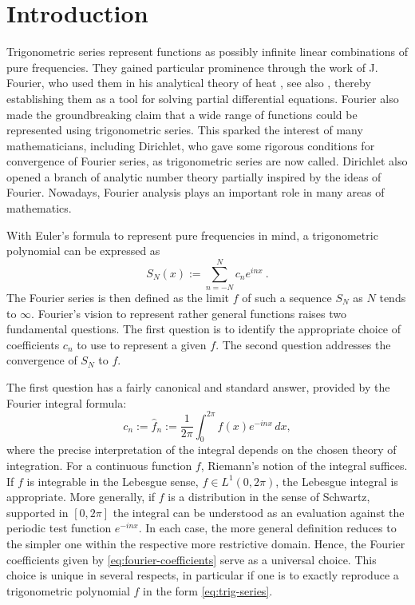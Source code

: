 \section{Introduction}


Trigonometric series represent functions as possibly infinite linear combinations of pure frequencies.
They gained particular prominence through the work of J. Fourier, who used them in his analytical theory of heat \cite{Fourier}, see also \cite{MR3470070}, thereby establishing them as a tool for solving partial differential equations.
Fourier also made the groundbreaking claim that a wide range of functions could be represented using trigonometric series. This sparked the interest of many mathematicians,
including Dirichlet, who gave some rigorous conditions for convergence of Fourier series, as trigonometric series are now called. Dirichlet also opened a branch of analytic number theory partially inspired by the ideas of
Fourier.
Nowadays, Fourier analysis plays an important role in many areas of mathematics.


With Euler's formula to represent pure frequencies in mind, a trigonometric polynomial can be expressed as
\begin{equation}\label{eq:trig-series}
    S_N(x):= \sum_{n=-N}^N c_n e^{inx} \ .
\end{equation}
The Fourier series is then defined as the limit $f$ of such a sequence $S_N$
as $N$ tends to $\infty$. Fourier's vision to represent rather general
functions raises two fundamental questions. The first question is to identify
the appropriate choice of coefficients $c_n$ to use to represent a given $f$.
The second question addresses the convergence of $S_N$ to $f$.

The first question has a fairly canonical and standard answer, provided by the Fourier integral formula:
\begin{equation}\label{eq:fourier-coefficients}
    c_n:=\widehat{f}_n:=\frac 1{2\pi}\int_0^{2\pi}f(x) e^{- i nx}\, dx,
\end{equation}
 where the precise interpretation of the integral depends on the chosen theory of integration. For a continuous function $f$,
Riemann's notion of the integral suffices. If $f$ is integrable in the Lebesgue sense,
$f\in L^1(0,2\pi)$, the Lebesgue integral is appropriate. More generally, if
$f$ is a distribution in the sense of Schwartz, supported in $[0,2\pi]$
the integral can be understood as an evaluation against the periodic test function
$e^{-i nx}$. In each case, the more general definition reduces to the simpler one within the respective more restrictive domain.
Hence, the Fourier coefficients given by \eqref{eq:fourier-coefficients} serve as a universal choice.
This choice is unique in several respects, in particular if one is to exactly reproduce
a trigonometric polynomial $f$ in the form
\eqref{eq:trig-series}.



